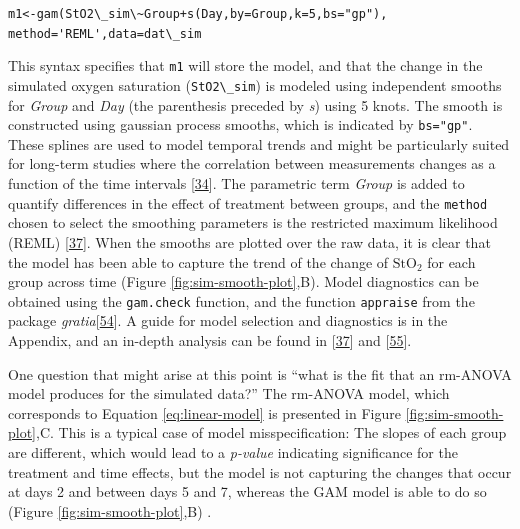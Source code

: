 \documentclass[
]{article}
\newcommand{\passthrough}[1]{#1}
\begin{document}
\passthrough{\lstinline!m1<-gam(StO2\_sim\~Group+s(Day,by=Group,k=5,bs="gp"), method='REML',data=dat\_sim!}

This syntax specifies that \passthrough{\lstinline!m1!} will store the model, and that the change in the simulated oxygen saturation (\passthrough{\lstinline!StO2\_sim!}) is modeled using independent smooths for \emph{Group} and \emph{Day} (the parenthesis preceded by \emph{s}) using 5 knots. The smooth is constructed using gaussian process smooths, which is indicated by \passthrough{\lstinline!bs="gp"!}. These splines are used to model temporal trends and might be particularly suited for long-term studies where the correlation between measurements changes as a function of the time intervals {[}\protect\hyperlink{ref-simpson2018}{34}{]}. The parametric term \emph{Group} is added to quantify differences in the effect of treatment between groups, and the \passthrough{\lstinline!method!} chosen to select the smoothing parameters is the restricted maximum likelihood (REML) {[}\protect\hyperlink{ref-wood2017}{37}{]}. When the smooths are plotted over the raw data, it is clear that the model has been able to capture the trend of the change of \(\mbox{StO}_2\) for each group across time (Figure \ref{fig:sim-smooth-plot},B). Model diagnostics can be obtained using the \passthrough{\lstinline!gam.check!} function, and the function \passthrough{\lstinline!appraise!} from the package \emph{gratia}{[}\protect\hyperlink{ref-gratia}{54}{]}. A guide for model selection and diagnostics is in the Appendix, and an in-depth analysis can be found in {[}\protect\hyperlink{ref-wood2017}{37}{]} and {[}\protect\hyperlink{ref-harezlak2018}{55}{]}.

One question that might arise at this point is ``what is the fit that an rm-ANOVA model produces for the simulated data?'' The rm-ANOVA model, which corresponds to Equation \eqref{eq:linear-model} is presented in Figure \ref{fig:sim-smooth-plot},C. This is a typical case of model misspecification: The slopes of each group are different, which would lead to a \emph{p-value} indicating significance for the treatment and time effects, but the model is not capturing the changes that occur at days 2 and between days 5 and 7, whereas the GAM model is able to do so (Figure \ref{fig:sim-smooth-plot},B) .
\end{document}
